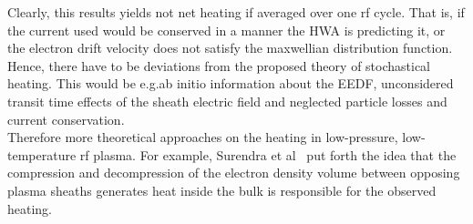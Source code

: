%
		Clearly, this results yields not net heating if averaged over one rf cycle. That is, if the current used would be conserved in a manner the HWA is predicting it, or the electron drift velocity does not satisfy the maxwellian distribution function. Hence, there have to be deviations from the proposed theory of stochastical heating. This would be e.g.\@ ab initio information about the EEDF, unconsidered transit time effects of the sheath electric field and neglected particle losses and current conservation.\\
		Therefore more theoretical approaches on the heating in low-pressure, low-temperature rf plasma. For example, Surendra et al~\cite{Surendra} put forth the idea that the compression and decompression of the electron density volume between opposing plasma sheaths generates heat inside the bulk is responsible for the observed heating.

